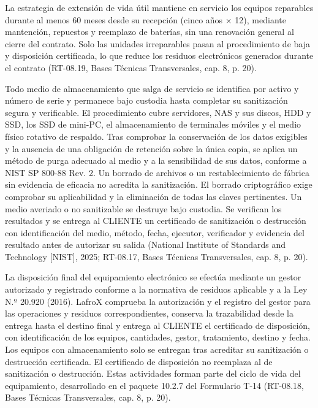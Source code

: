 La estrategia de extensión de vida útil mantiene en servicio los equipos reparables durante al menos 60 meses desde su recepción (cinco años × 12), mediante mantención, repuestos y reemplazo de baterías, sin una renovación general al cierre del contrato. Solo las unidades irreparables pasan al procedimiento de baja y disposición certificada, lo que reduce los residuos electrónicos generados durante el contrato (RT-08.19, Bases Técnicas Transversales, cap. 8, p. 20).

Todo medio de almacenamiento que salga de servicio se identifica por activo y número de serie y permanece bajo custodia hasta completar su sanitización segura y verificable. El procedimiento cubre servidores, NAS y sus discos, HDD y SSD, los SSD de mini-PC, el almacenamiento de terminales móviles y el medio físico rotativo de respaldo. Tras comprobar la conservación de los datos exigibles y la ausencia de una obligación de retención sobre la única copia, se aplica un método de purga adecuado al medio y a la sensibilidad de sus datos, conforme a NIST SP 800-88 Rev. 2. Un borrado de archivos o un restablecimiento de fábrica sin evidencia de eficacia no acredita la sanitización. El borrado criptográfico exige comprobar su aplicabilidad y la eliminación de todas las claves pertinentes. Un medio averiado o no sanitizable se destruye bajo custodia. Se verifican los resultados y se entrega al CLIENTE un certificado de sanitización o destrucción con identificación del medio, método, fecha, ejecutor, verificador y evidencia del resultado antes de autorizar su salida (National Institute of Standards and Technology [NIST], 2025; RT-08.17, Bases Técnicas Transversales, cap. 8, p. 20).

La disposición final del equipamiento electrónico se efectúa mediante un gestor autorizado y registrado conforme a la normativa de residuos aplicable y a la Ley N.º 20.920 (2016). LafroX comprueba la autorización y el registro del gestor para las operaciones y residuos correspondientes, conserva la trazabilidad desde la entrega hasta el destino final y entrega al CLIENTE el certificado de disposición, con identificación de los equipos, cantidades, gestor, tratamiento, destino y fecha. Los equipos con almacenamiento solo se entregan tras acreditar su sanitización o destrucción certificada. El certificado de disposición no reemplaza al de sanitización o destrucción. Estas actividades forman parte del ciclo de vida del equipamiento, desarrollado en el paquete 10.2.7 del Formulario T-14 (RT-08.18, Bases Técnicas Transversales, cap. 8, p. 20).

